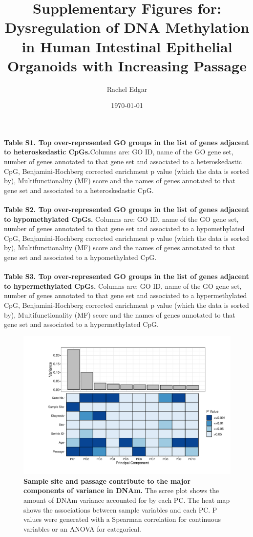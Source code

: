 \documentclass[a4paper]{article}
\title{Supplementary Figures for: Dysregulation of DNA Methylation in Human Intestinal Epithelial Organoids with Increasing Passage}
\author{Rachel Edgar}
\date{\today}
\begin{document}
\maketitle


\textbf{Table S1. Top over-represented GO groups in the list of genes adjacent to heteroskedastic CpGs.}Columns are: GO ID, name of the GO gene set, number of genes annotated to that gene set and associated to a heteroskedastic CpG, Benjamini-Hochberg corrected enrichment p value (which the data is sorted by), Multifunctionality (MF) score and the names of genes annotated to that gene set and associated to a heteroskedastic CpG.
\\
\\
\textbf{Table S2. Top over-represented GO groups in the list of genes adjacent to hypomethylated CpGs.} Columns are: GO ID, name of the GO gene set, number of genes annotated to that gene set and associated to a hypomethylated CpG, Benjamini-Hochberg corrected enrichment p value (which the data is sorted by), Multifunctionality (MF) score and the names of genes annotated to that gene set and associated to a hypomethylated CpG.
\\
\\
\textbf{Table S3. Top over-represented GO groups in the list of genes adjacent to hypermethylated CpGs.} Columns are: GO ID, name of the GO gene set, number of genes annotated to that gene set and associated to a hypermethylated CpG, Benjamini-Hochberg corrected enrichment p value (which the data is sorted by), Multifunctionality (MF) score and the names of genes annotated to that gene set and associated to a hypermethylated CpG.






\begin{figure}
\includegraphics[width=1\textwidth]{../figs/heat_scree_EPIC_organoid.pdf}
\caption{\textbf{Sample site and passage contribute to the major components of variance in DNAm. } The scree plot shows the amount of DNAm variance accounted for by each PC. The heat map shows the associations between sample variables and each PC. P values were generated with a Spearman correlation for continuous variables or an ANOVA for categorical. }
\end{figure}
\end{document}
